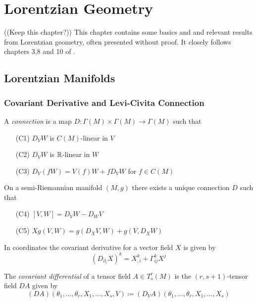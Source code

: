 \chapter{Lorentzian Geometry}
((Keep this chapter?))
This chapter contains some basics and and relevant results from Lorentzian geometry, often presented without proof. It closely follows chapters 3,8 and 10 of \cite{oneill}.
\section{Lorentzian Manifolds}
\subsection{Covariant Derivative and Levi-Civita Connection}

\begin{definition}[Connection]
A \emph{connection} is a map $D:\Gamma(M)\times\Gamma(M)\to\Gamma(M)$ such that

\begin{itemize}
    \item[(C1)] $D_VW$ is $C(M)$-linear in $V$
    \item[(C2)] $D_VW$ is $\mathbb{R}$-linear in $W$
    \item[(C3)] $D_V(fW) = V(f)W + fD_VW$ for $f\in C(M)$
\end{itemize}

\end{definition}

\begin{theorem}
On a semi-Riemannian manifold $(M,g)$ there exists a unique connection $D$ such that
\begin{itemize}
    \item[(C4)] $[V,W] = D_VW-D_WV$
    \item[(C5)] $Xg(V,W)=g(D_XV,W)+g(V,D_XW)$
\end{itemize}
\end{theorem}


\begin{proposition}
In coordinates the covariant derivative for a vector field $X$ is given by 
\begin{equation*}
    (D_{\partial_i}X)^{k} = X^k_{,i}+\Gamma^k_{ij}X^j
\end{equation*}
\end{proposition}

\begin{definition}
The \emph{covariant differential} of a tensor field $A\in T^r_s(M)$ is the $(r,s+1)$-tensor field $DA$ given by
\begin{equation*}
    (DA)(\theta_1,\dots,\theta_r,X_1,\dots,X_s,V) \coloneqq (D_VA)(\theta_1,\dots,\theta_r,X_1,\dots,X_s)
\end{equation*}
\end{definition}

